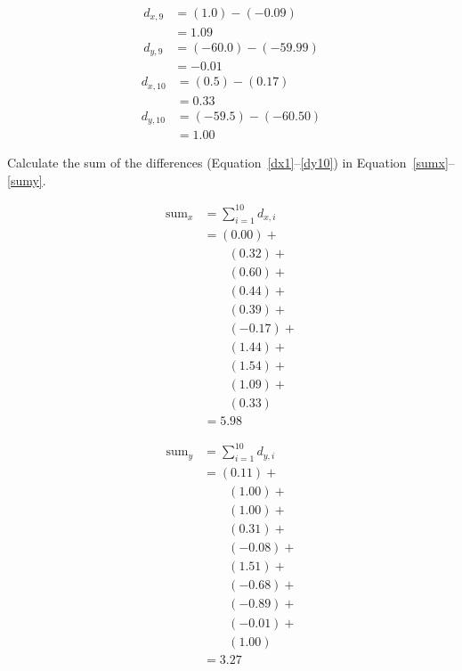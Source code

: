 \documentclass[twocolumn]{article}
\begin{document}
\begin{align}
d_{x,9} &= (1.0) - (-0.09) \nonumber\\
 &= 1.09 \label{dx9}\\
d_{y,9} &= (-60.0) - (-59.99) \nonumber\\
 &= -0.01 \label{dy9}
\end{align}
\begin{align}
d_{x,10} &= (0.5) - (0.17) \nonumber\\
 &= 0.33 \label{dx10}\\
d_{y,10} &= (-59.5) - (-60.50) \nonumber\\
 &= 1.00 \label{dy10}
\end{align}

Calculate the sum of the differences (Equation~\ref{dx1}--\ref{dy10}) in Equation~\ref{sumx}--\ref{sumy}.

\begin{align}
\text{sum}_{x} &= \sum_{i=1}^{10} d_{x,i} \nonumber\\
 &= (0.00) + \nonumber\\
 &\quad\quad (0.32) + \nonumber\\
 &\quad\quad (0.60) + \nonumber\\
 &\quad\quad (0.44) + \nonumber\\
 &\quad\quad (0.39) + \nonumber\\
 &\quad\quad (-0.17) + \nonumber\\
 &\quad\quad (1.44) + \nonumber\\
 &\quad\quad (1.54) + \nonumber\\
 &\quad\quad (1.09) + \nonumber\\
 &\quad\quad (0.33) \nonumber\\
 &= 5.98 \label{sumx}
\end{align}

\begin{align}
\text{sum}_{y} &= \sum_{i=1}^{10} d_{y,i} \nonumber\\
 &= (0.11) + \nonumber\\
 &\quad\quad (1.00) + \nonumber\\
 &\quad\quad (1.00) + \nonumber\\
 &\quad\quad (0.31) + \nonumber\\
 &\quad\quad (-0.08) + \nonumber\\
 &\quad\quad (1.51) + \nonumber\\
 &\quad\quad (-0.68) + \nonumber\\
 &\quad\quad (-0.89) + \nonumber\\
 &\quad\quad (-0.01) + \nonumber\\
 &\quad\quad (1.00) \nonumber\\
 &= 3.27 \label{sumy}
\end{align}
\end{document}
